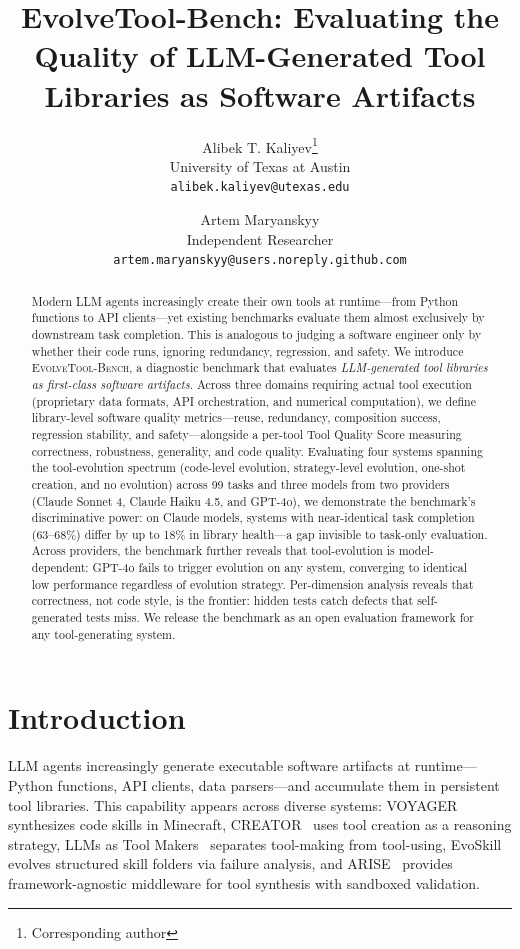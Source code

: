 \documentclass[10pt,twocolumn]{article}
\title{\textbf{EvolveTool-Bench}: Evaluating the Quality of LLM-Generated Tool Libraries as Software Artifacts}
\author{%
\begin{tabular}[t]{c}
Alibek T. Kaliyev\thanks{Corresponding author}\\
University of Texas at Austin\\
\texttt{alibek.kaliyev@utexas.edu}
\end{tabular}
\hspace{2em}
\and
\begin{tabular}[t]{c}
Artem Maryanskyy\\
Independent Researcher\\
\texttt{artem.maryanskyy@users.noreply.github.com}
\end{tabular}
}
\date{}
\begin{document}
\maketitle

\begin{abstract}
Modern LLM agents increasingly create their own tools at runtime---from Python functions to API clients---yet existing benchmarks evaluate them almost exclusively by downstream task completion. This is analogous to judging a software engineer only by whether their code runs, ignoring redundancy, regression, and safety. We introduce \textsc{EvolveTool-Bench}, a diagnostic benchmark that evaluates \emph{LLM-generated tool libraries as first-class software artifacts}. Across three domains requiring actual tool execution (proprietary data formats, API orchestration, and numerical computation), we define library-level software quality metrics---reuse, redundancy, composition success, regression stability, and safety---alongside a per-tool Tool Quality Score measuring correctness, robustness, generality, and code quality. Evaluating four systems spanning the tool-evolution spectrum (code-level evolution, strategy-level evolution, one-shot creation, and no evolution) across 99 tasks and three models from two providers (Claude Sonnet 4, Claude Haiku 4.5, and GPT-4o), we demonstrate the benchmark's discriminative power: on Claude models, systems with near-identical task completion (63--68\%) differ by up to 18\% in library health---a gap invisible to task-only evaluation. Across providers, the benchmark further reveals that tool-evolution is model-dependent: GPT-4o fails to trigger evolution on any system, converging to identical low performance regardless of evolution strategy. Per-dimension analysis reveals that correctness, not code style, is the frontier: hidden tests catch defects that self-generated tests miss. We release the benchmark as an open evaluation framework for any tool-generating system.
\end{abstract}

\section{Introduction}

LLM agents increasingly generate executable software artifacts at runtime---Python functions, API clients, data parsers---and accumulate them in persistent tool libraries. This capability appears across diverse systems: VOYAGER~\cite{wang2023voyager} synthesizes code skills in Minecraft, CREATOR~\cite{qian2023creator} uses tool creation as a reasoning strategy, LLMs as Tool Makers~\cite{cai2023latm} separates tool-making from tool-using, EvoSkill~\cite{alzubi2026evoskill} evolves structured skill folders via failure analysis, and ARISE~\cite{kaliyev2026arise} provides framework-agnostic middleware for tool synthesis with sandboxed validation.
\end{document}
